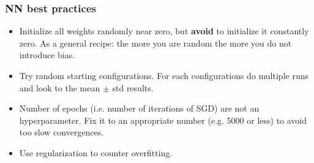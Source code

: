 \documentclass{beamer}
\begin{document}
	\begin{frame}
		\frametitle{NN best practices}
		\begin{itemize}
			\item Initialize all weights randomly near zero, but \textbf{avoid} to initialize it constantly zero. As a general recipe: the more you are random the more you do not introduce bias.
			\item Try random starting configurations. For each configurations do multiple runs and look to the mean $\pm$ std results. 
			\item Number of epochs (i.e. number of iterations of SGD) are not an hyperparameter. Fix it to an appropriate number (e.g. 5000 or less) to avoid too slow convergences.
			\item Use regularization to counter overfitting.
		\end{itemize}
	\end{frame}
\end{document}
